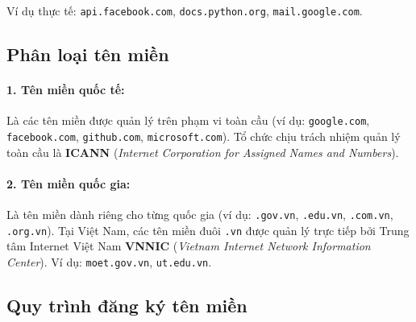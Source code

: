 \documentclass[11pt,oneside]{book}
\newcommand{\thd}[1]{\textcolor{white}{\textbf{\strut #1}}}
\newcommand{\codeinline}[1]{\textcolor{accentOrange}{\texttt{#1}}}
\begin{document}
\begin{prettyTableBox}
\end{prettyTableBox}

Ví dụ thực tế: \codeinline{api.facebook.com}, \codeinline{docs.python.org}, \codeinline{mail.google.com}.

\subsection{Phân loại tên miền}

\paragraph{1. Tên miền quốc tế:} Là các tên miền được quản lý trên phạm vi toàn cầu (ví dụ: \codeinline{google.com}, \codeinline{facebook.com}, \codeinline{github.com}, \codeinline{microsoft.com}). Tổ chức chịu trách nhiệm quản lý toàn cầu là \textbf{ICANN} (\textit{Internet Corporation for Assigned Names and Numbers}).

\paragraph{2. Tên miền quốc gia:} Là tên miền dành riêng cho từng quốc gia (ví dụ: \codeinline{.gov.vn}, \codeinline{.edu.vn}, \codeinline{.com.vn}, \codeinline{.org.vn}). Tại Việt Nam, các tên miền đuôi \codeinline{.vn} được quản lý trực tiếp bởi Trung tâm Internet Việt Nam \textbf{VNNIC} (\textit{Vietnam Internet Network Information Center}). Ví dụ: \codeinline{moet.gov.vn}, \codeinline{ut.edu.vn}.

\subsection{Quy trình đăng ký tên miền}
\end{document}
